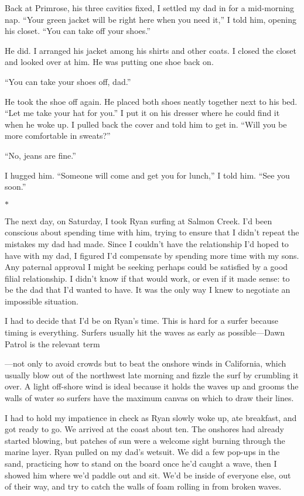 \documentclass[12pt]{book}
\begin{document}
Back at Primrose, his three cavities fixed, I settled my dad in for a mid-morning nap. ``Your green jacket will be right here when you need it,'' I told him, opening his closet. ``You can take off your shoes.''

He did. I arranged his jacket among his shirts and other coats. I closed the closet and looked over at him. He was putting one shoe back on.

``You can take your shoes off, dad.''

He took the shoe off again. He placed both shoes neatly together next to his bed. ``Let me take your hat for you.'' I put it on his dresser where he could find it when he woke up. I pulled back the cover and told him to get in. ``Will you be more comfortable in sweats?''

``No, jeans are fine.''

I hugged him. ``Someone will come and get you for lunch,'' I told him. ``See you soon.''

\begin{center}$*$\end{center}

The next day, on Saturday, I took Ryan surfing at Salmon Creek. I'd been conscious about spending time with him, trying to ensure that I didn't repeat the mistakes my dad had made. Since I couldn't have the relationship I'd hoped to have with my dad, I figured I'd compensate by spending more time with my sons. Any paternal approval I might be seeking perhaps could be satisfied by a good filial relationship. I didn't know if that would work, or even if it made sense: to be the dad that I'd wanted to have. It was the only way I knew to negotiate an impossible situation.

I had to decide that I'd be on Ryan's time. This is hard for a surfer because timing is everything. Surfers usually hit the waves as early as possible---Dawn Patrol is the relevant term

---not only to avoid crowds but to beat the onshore winds in California, which usually blow out of the northwest late morning and fizzle the surf by crumbling it over. A light off-shore wind is ideal because it holds the waves up and grooms the walls of water so surfers have the maximum canvas on which to draw their lines.

I had to hold my impatience in check as Ryan slowly woke up, ate breakfast, and got ready to go. We arrived at the coast about ten. The onshores had already started blowing, but patches of sun were a welcome sight burning through the marine layer. Ryan pulled on my dad's wetsuit. We did a few pop-ups in the sand, practicing how to stand on the board once he'd caught a wave, then I showed him where we'd paddle out and sit. We'd be inside of everyone else, out of their way, and try to catch the walls of foam rolling in from broken waves.
\end{document}
